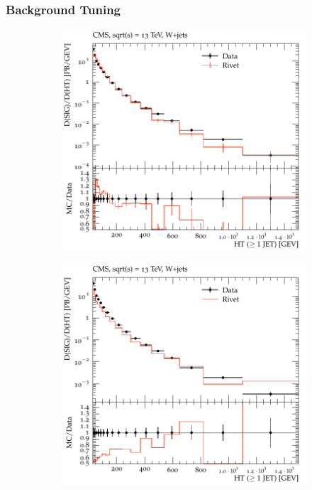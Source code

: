 \documentclass{beamer}
\begin{document}

\begin{frame}
\frametitle{Background Tuning}

\begin{figure}[!h]
	
	\begin{subfigure}[b]{0.44\textwidth}
		\centering
		\includegraphics[width=\textwidth]{pictures/MCTunig/HT}
		\caption{\label{HTTune}}
	\end{subfigure}
	\begin{subfigure}[b]{0.44\textwidth}
		\centering
		\includegraphics[width=\textwidth]{pictures/MCTunig/HT_Nelson}

\end{subfigure}
\end{figure}
\end{frame}
\end{document}
